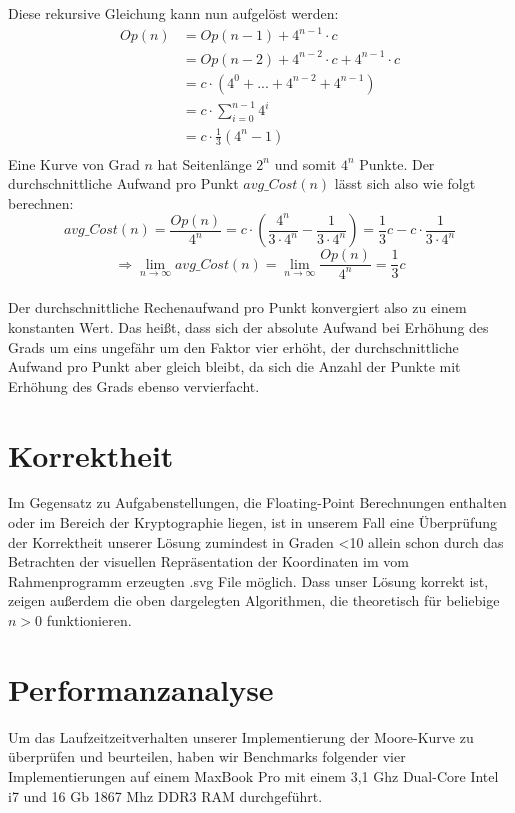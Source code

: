 \documentclass[course=erap]{aspdoc}
\begin{document}
Diese rekursive Gleichung kann nun aufgelöst werden:  \ \\ 
\begin{align*}
  Op(n) &= Op(n-1) + 4^{n-1}\cdot c\\
    &= Op(n-2) + 4^{n-2}\cdot c + 4^{n-1}\cdot c \\
    &= c\cdot(4^{0} + ... + 4^{n-2} + 4^{n-1}) \\
    &= c\cdot\sum_{i=0}^{n-1} 4^{i}\\
    &= c\cdot\frac{1}{3}(4^n-1)\\
\end{align*}
Eine Kurve von Grad $n$ hat Seitenlänge $2^n$ und somit $4^n$ Punkte. Der durchschnittliche Aufwand pro Punkt $avg\_Cost(n)$ lässt sich also wie folgt berechnen: \ \\
\[avg\_Cost(n) = \frac{Op(n)}{4^n} = c \cdot \left(\frac{4^n}{3 \cdot 4^n} - \frac{1}{3 \cdot 4^n}\right) = \frac{1}{3}c - c \cdot \frac{1}{3 \cdot 4^n}\] 
\[\Rightarrow \lim_{n\to\infty} avg\_Cost(n) = \lim_{n\to\infty} \frac{Op(n)}{4^n} = \frac{1}{3}c\]  \ \\ 
Der durchschnittliche Rechenaufwand pro Punkt konvergiert also zu einem konstanten Wert. Das heißt, dass sich der absolute Aufwand bei Erhöhung des Grads um eins ungefähr um den Faktor vier erhöht, der durchschnittliche Aufwand pro Punkt aber gleich bleibt, da sich die Anzahl der Punkte mit Erhöhung des Grads ebenso vervierfacht.

\section{Korrektheit}
Im Gegensatz zu Aufgabenstellungen, die Floating-Point Berechnungen enthalten oder im Bereich der Kryptographie liegen, ist in unserem Fall eine Überprüfung der Korrektheit unserer Lösung zumindest in Graden <10 allein schon durch das Betrachten der visuellen Repräsentation der Koordinaten im vom Rahmenprogramm erzeugten .svg File möglich. Dass unser Lösung korrekt ist, zeigen außerdem die oben dargelegten Algorithmen, die theoretisch für beliebige $n>0$ funktionieren.



\section{Performanzanalyse}
Um das Laufzeitzeitverhalten unserer Implementierung der Moore-Kurve zu überprüfen und beurteilen, haben wir Benchmarks folgender vier Implementierungen auf einem MaxBook Pro mit einem 3,1 Ghz Dual-Core Intel i7 und 16 Gb 1867 Mhz DDR3 RAM durchgeführt.
\end{document}
